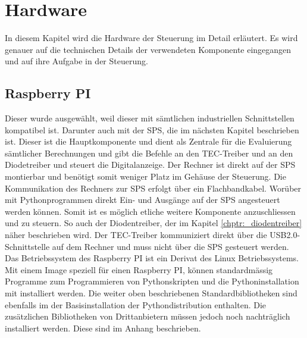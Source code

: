 \section{Hardware}
In diesem Kapitel wird die Hardware der Steuerung im Detail erläutert. Es wird genauer auf die technischen Details der verwendeten Komponente eingegangen und auf ihre Aufgabe in der Steuerung.


\subsection{Raspberry PI}
Dieser wurde ausgewählt, weil dieser mit sämtlichen industriellen Schnittstellen kompatibel ist. Darunter auch mit der SPS, die im nächsten Kapitel beschrieben ist. Dieser ist die Hauptkomponente und dient als Zentrale für die Evaluierung sämtlicher Berechnungen und gibt die Befehle an den TEC-Treiber und an den Diodetreiber und steuert die Digitalanzeige. Der Rechner ist direkt auf der SPS montierbar und benötigt somit weniger Platz im Gehäuse der Steuerung. Die Kommunikation des Rechners zur SPS erfolgt über ein Flachbandkabel. Worüber mit Pythonprogrammen direkt Ein- und Ausgänge auf der SPS angesteuert werden können. Somit ist es möglich etliche weitere Komponente anzuschliessen und zu steuern. So auch der Diodentreiber, der im Kapitel \ref{chptr:_diodentreiber} näher beschrieben wird. Der TEC-Treiber kommuniziert direkt über die USB2.0-Schnittstelle auf dem Rechner und muss nicht über die SPS gesteuert werden.\\
Das Betriebssystem des Raspberry PI ist ein Derivat des Linux Betriebssystems. Mit einem Image speziell für einen Raspberry PI, können standardmässig Programme zum Programmieren von Pythonskripten und die Pythoninstallation mit installiert werden. Die weiter oben beschriebenen Standardbibliotheken sind ebenfalls im der Basisinstallation der Pythondistribution enthalten. Die zusätzlichen Bibliotheken von Drittanbietern müssen jedoch noch nachträglich installiert werden. Diese sind im Anhang beschrieben.

